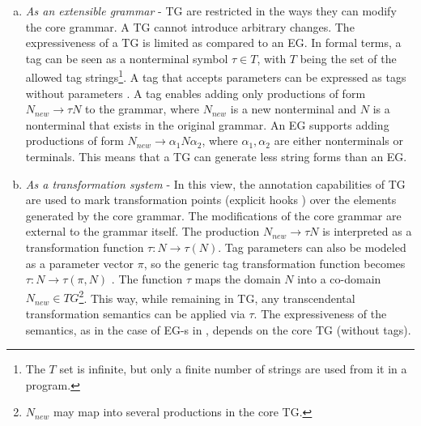 \begin{enumerate}[a.]
\item \textit{As an extensible grammar} - TG are restricted in the ways they can modify the core grammar. A TG cannot introduce arbitrary changes. The expressiveness of a TG is limited as compared to an EG. In formal terms, a tag can be seen as a nonterminal symbol $\tau \in T$, with $T$ being the set of the allowed tag strings\footnote{The $T$ set is infinite, but only a finite number of strings are used from it in a program.}. A tag that accepts parameters can be expressed as tags without parameters . A tag enables adding only productions of form $N_{new} \rightarrow \tau N$ to the grammar, where $N_{new}$ is a new nonterminal and $N$ is a nonterminal that exists in the original grammar. An EG supports adding productions of form $N_{new} \rightarrow \alpha_{1} N \alpha_{2}$, where $\alpha_{1}, \alpha_{2}$ are either nonterminals or terminals. This means that a TG can generate less string forms than an EG. 


\item \textit{As a transformation system} - In this view, the annotation capabilities of TG are used to mark transformation points (explicit hooks \cite{java.compost}) over the elements generated by the core grammar. The modifications of the core grammar are external to the grammar itself. The production $N_{new} \rightarrow \tau N$ is interpreted as a transformation function $\tau: N \rightarrow \tau(N)$. Tag parameters can also be modeled as a parameter vector $\pi$, so the generic tag transformation function becomes $\tau: N \rightarrow \tau(\pi, N)$ . The function $\tau$ maps the domain $N$ into a co-domain $N_{new} \in TG$\footnote{$N_{new}$ may map into several productions in the core TG.}. This way, while remaining in TG, any transcendental transformation semantics can be applied via $\tau$. The expressiveness of the semantics, as in the case of EG-s in \cite{cardelli94extensible}, depends on the core TG (without tags).

\end{enumerate}

